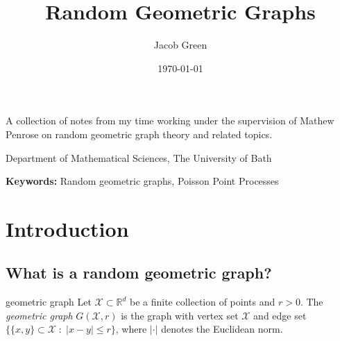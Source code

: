 \documentclass{article}
\title{Random Geometric Graphs}
\author{Jacob Green}
\date{\today}
\newcommand{\subtitle}{A collection of notes from my time working under the supervision of Mathew Penrose on 
random geometric graph theory and related topics.}
\newcommand{\institution}{Department of Mathematical Sciences, The University of Bath}
\newcommand{\keywords}{Random geometric graphs, Poisson Point Processes}
\newcounter{globaltcb} %
\begin{document}
\begin{titlepage}
    \centering
    
    {\Huge \bfseries \thetitle \par}
    \vspace{0.5cm}
    
    {\Large \subtitle \par}
    \vspace{1cm}
    
    {\large \theauthor \par}
    {\institution \par}
    \vspace{1cm}
    
    {\large \thedate \par}
    \vspace{1.5cm}
    
    \begin{abstract}
        \lipsum[10]
    \end{abstract}
    \vspace{1cm}
    
    \textbf{Keywords:} \keywords
    \vfill %
    
    \textit{}
\end{titlepage}

\newpage

\tableofcontents 

\newpage 

\setcounter{page}{1} %

\section{Introduction}

\setcounter{globaltcb}{1} %

\subsection{What is a random geometric graph?}

\begin{definition}[]{geometric graph}
    Let $\mathcal{X} \subset \mathbb{R}^d$ be a finite collection of points and $r > 0$. The {\it geometric graph}
    $G(\mathcal{X}, r)$ is the graph with vertex set $\mathcal{X}$ and edge set $\{\{x, y\} \subset \mathcal{X} 
    \; : \; \lvert x - y \rvert \leq r\}$, where $\lvert \cdot \rvert$ denotes the Euclidean norm. 
\end{definition}
\end{document}
